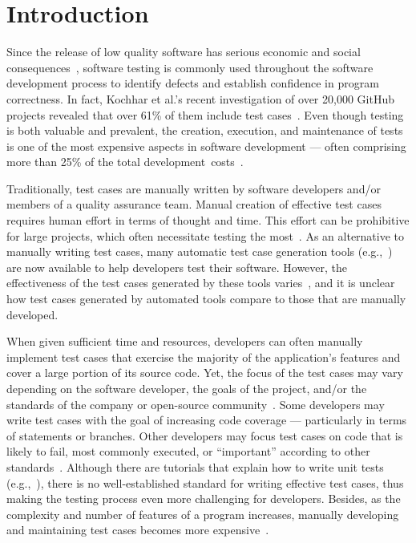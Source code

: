 
\section{Introduction}

Since the release of low quality software has serious economic and social
consequences~\cite{tassey2002}, software testing is commonly used throughout the
software development process to identify defects and establish confidence in
program correctness. In fact, Kochhar et al.'s recent investigation of over
20,000 GitHub projects revealed that over 61\% of them include test
cases~\cite{kochhar2013}.  Even though testing is both valuable and prevalent,
the creation, execution, and maintenance of tests is one of the most expensive
aspects in software development --- often comprising more than 25\% of the total
\mbox{development costs~\cite{vizard2013}.}

Traditionally, test cases are manually written by software developers and/or
members of a quality assurance team.  Manual creation of effective test cases
requires human effort in terms of thought and time.  This effort can be
prohibitive for large projects, which often necessitate testing the
most~\cite{kochhar2013}.  As an alternative to manually writing test cases, many
automatic test case generation tools
(e.g.,~\cite{fraser:2011:eat:2025113.2025179,pacheco2007feedback,csallner2004})
are now available to help developers test their software.  However, the
effectiveness of the test cases generated by these tools
varies~\cite{bacchelli2008,fraser2013c,fraser2013a}, and it is unclear how test
cases generated by automated tools compare to those that are manually developed.

When given sufficient time and resources, developers can often manually
implement test cases that exercise the majority of the application's features
and cover a large portion of its source code.  Yet, the focus of the test cases
may vary depending on the software developer, the goals of the project, and/or
the standards of the company or open-source community~\cite{kochhar2013}.  Some
developers may write test cases with the goal of increasing code coverage ---
particularly in terms of statements or branches.  Other developers may focus
test cases on code that is likely to fail, most commonly executed, or
``important'' according to other standards~\cite{mockus2009}. 
Although there are tutorials that explain how to write unit tests
(e.g.,~\cite{vogella2013}), there is no well-established standard for writing
effective test cases, thus making the testing process even more challenging for
developers.  Besides, as the complexity and number of features of a program
increases, manually developing and maintaining test cases becomes more
expensive~\cite{clarke1998automated}.  

